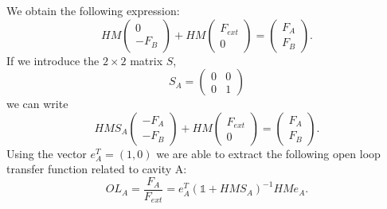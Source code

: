 We obtain the following expression:
\begin{equation}
HM
\left( \begin{array}{c}
0\\ -F_B
\end{array} \right)
+
HM
\left( \begin{array}{c}
F_{ext}\\0
\end{array} \right)
=
\left( \begin{array}{c}
F_A\\F_B
\end{array} \right).
\end{equation}
If we introduce the $2\times2$ matrix $S$,
\begin{equation}
S_A=
\left( \begin{array}{cc}
0 & 0\\
0 & 1
\end{array} \right)
\end{equation}
we can  write
\begin{equation}
HMS_A
\left( \begin{array}{c}
- F_A\\ - F_B
\end{array} \right)
+
HM
\left( \begin{array}{c}
F_{ext}\\0
\end{array} \right)
=
\left( \begin{array}{c}
F_A\\F_B
\end{array} \right).
\end{equation}
Using the vector $e_A^{T}=(1,0)$ we are able to extract the following open loop
transfer function related to cavity A:
\begin{equation}
OL_{A}=\frac{F_{A}}{F_{ext}}=e_A^{T}(\mathds{1}+HMS_A)^{-1}HMe_A.
\end{equation}


